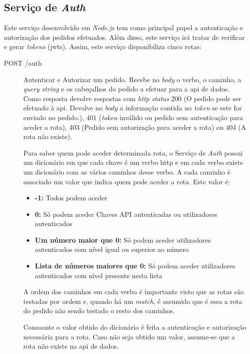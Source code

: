 \subsection{Serviço de \textit{Auth}}
Este serviço desenvolvido em \textit{Node.js} tem como principal papel a autenticação e autorização dos pedidos efetuados. Além disso, este serviço irá tratar de verificar e gerar \textit{tokens} (\acrshort{jwt}s). Assim, este serviço disponibiliza cinco rotas:
\begin{description}
    \item[POST /auth] Autenticar e Autorizar um pedido. Recebe no \textit{body} o verbo, o caminho, a \textit{query string} e os cabeçalhos do pedido a efetuar para a \acrshort{api} de dados. Como resposta devolve respostas com \textit{\acrshort{http} status} 200 (O pedido pode ser efetuado à \acrshort{api}. Devolve no \textit{body}  a informação contida no \textit{token} se este for enviado no pedido.), 401 (\textit{token} inválido ou pedido sem autenticação para aceder a rota), 403 (Pedido sem autorização para aceder a rota) ou 404 (A rota não existe).

        Para saber quem pode aceder determinada rota, o Serviço de \textit{Auth} possui um dicionário em que cada chave é um verbo \acrshort{http} e em cada verbo existe um dicionário com as vários caminhos desse verbo. A cada caminho é associado um valor que indica quem pode aceder a rota. Este valor é:
        \begin{itemize}
            \item \textbf{-1:} Todos podem aceder
            \item \textbf{0:} Só podem aceder Chaves API autenticadas ou utilizadores autenticados
            \item \textbf{Um número maior que 0:} Só podem aceder utilizadores autenticados com nível igual ou superior ao número
            \item \textbf{Lista de números maiores que 0:} Só podem aceder utilizadores autenticados com nível presente nesta lista
        \end{itemize}
        A ordem dos caminhos em cada verbo é importante visto que as rotas são testadas por ordem e, quando há um \textit{match}, é assumido que é essa a rota do pedido não sendo testado o resto dos caminhos.

        Consoante o valor obtido do dicionário é feita a autenticação e autorização necessária para a rota. Caso não seja obtido um valor, assume-se que a rota não existe na \acrshort{api} de dados.


\end{description}
